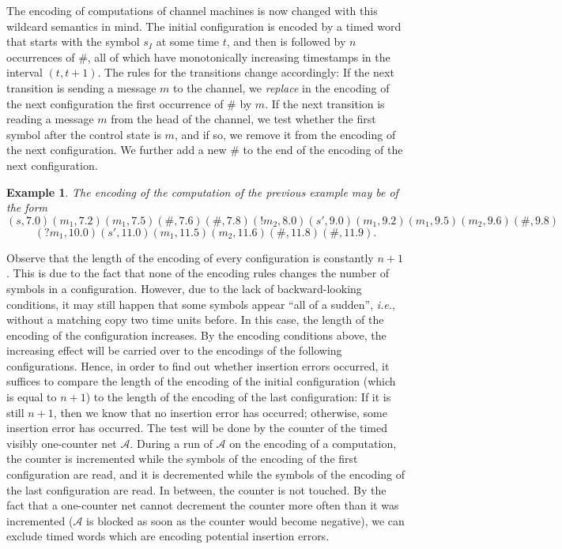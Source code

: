 \documentclass{CSML}
\theoremstyle{plain}\newtheorem{theorem}[thm]{Theorem}
\theoremstyle{plain}\newtheorem{corollary}[thm]{Corollary}
\theoremstyle{plain}\newtheorem{example}[thm]{Example}
\theoremstyle{plain}\newtheorem{lemma}[thm]{Lemma}
\theoremstyle{plain}\newtheorem{remark}[thm]{Remark}
\newcommand*\ie{\textit{i.e.}}
\newcommand{\A}{\mathcal{A}}
\begin{document}
The encoding of computations of channel machines is now changed with this wildcard semantics in mind. 
The initial configuration is encoded by a timed word that starts with the symbol $s_I$ at some time $t$, and then is followed by $n$ occurrences of $\#$, all of which have monotonically increasing timestamps in the interval $(t,t+1)$. 
The rules for the transitions change accordingly:
If the next transition is sending a message $m$ to the channel, we \emph{replace} in the encoding of the next configuration the first occurrence of $\#$ by $m$. 
If the next transition is reading a message $m$ from the head of the channel, we test whether the first symbol after the control state is $m$, and if so, we remove it from the encoding of the next configuration. We further add a new $\#$ to the end of the encoding of the next configuration.\begin{example}
	The encoding of the computation of the previous example may be of the form
	$$(s,7.0)(m_1,7.2)(m_1,7.5)(\#,7.6)(\#,7.8)(!m_2,8.0)(s',9.0)(m_1,9.2)(m_1,9.5)(m_2,9.6)(\#,9.8)$$
	$$(?m_1,10.0)
	(s',11.0)(m_1,11.5)(m_2,11.6)(\#,11.8)(\#,11.9).$$
\end{example}
Observe that the length of the encoding of every configuration is constantly $n+1$. This is due to the fact that none of the encoding rules changes the number of symbols in a configuration. 
However, due to the lack of backward-looking conditions, 
it may still happen that some symbols appear ``all of a sudden'', \ie, without a matching copy two time units before. 
In this case, the length of the encoding of the configuration increases. By the encoding conditions above, the increasing effect will be carried over to the encodings of the following configurations. 
Hence, in order to find out whether insertion errors occurred, 
it suffices to compare the length of the encoding of the initial configuration (which is equal to $n+1$) to the length of the encoding of the last configuration: If it is still $n+1$, then we know that no insertion error has occurred; otherwise, some insertion error has occurred. 
The test will be done by the counter of the timed visibly one-counter net $\A$. 
During a run of $\A$ on the encoding of a computation, 
the counter is incremented while the symbols of the encoding of the first configuration are read, and it is decremented while the symbols of the encoding of the last configuration are read. In between, the counter is not touched. By the fact that a one-counter net cannot decrement the counter more often than it was incremented ($\A$ is blocked as soon as the counter would become negative), we can exclude timed words which are encoding potential insertion errors. 
\end{document}
